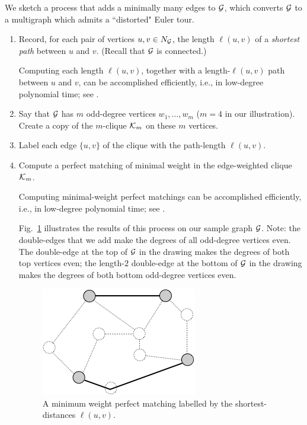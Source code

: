 We sketch a process that adds a minimally many edges to $\mbox{$\cal G$}$, which converts $\mbox{$\cal G$}$ to a multigraph which admits a ``distorted" Euler tour. 
\begin{enumerate}
\item
Record, for each pair of vertices $u, v \in N_{\mbox{{\scriptsize $\cal G$}}}$, the  length $\ell(u,v)$ of a {\em shortest path} between $u$ and $v$.  (Recall that $\mbox{$\cal G$}$ is connected.)

\smallskip

Computing each length $\ell(u,v)$, together with a length-$\ell(u,v)$ path between $u$ and $v$, can be accomplished efficiently, i.e., in low-degree polynomial time; see \cite{CLRS}.

\item
Say that $\mbox{$\cal G$}$ has $m$ odd-degree vertices $w_1, \ldots, w_m$ ($m=4$ in our illustration).  Create a copy of the $m$-clique $\mbox{$\cal K$}_m$ on these $m$ vertices.

\item
Label each edge $\{u,v\}$ of the clique with the path-length $\ell(u,v)$.

\item
Compute a perfect matching of minimal weight in the edge-weighted clique $\mbox{$\cal K$}_m$.

\smallskip

Computing minimal-weight perfect matchings can be accomplished efficiently, i.e., in low-degree polynomial time; see \cite{CLRS}.

\smallskip

Fig.~\ref{fig:Eulerianperfectmatching} illustrates the results of this process on our sample graph $\mbox{$\cal G$}$.   Note: the double-edges that we add make the degrees of all odd-degree vertices even.  The double-edge at the top of $\mbox{$\cal G$}$ in the drawing makes the degrees of both top vertices even; the length-$2$ double-edge at the bottom of $\mbox{$\cal G$}$ in the drawing makes the degrees of both bottom odd-degree vertices even.
\begin{figure}[hbt]
\begin{center}
       \includegraphics[scale=0.4]{FiguresGraph/EulerienPerfectMatching}
       \caption{A minimum weight perfect matching labelled by the shortest-distances $\ell(u,v)$.}
              \label{fig:Eulerianperfectmatching}
\end{center}
\end{figure}


\end{enumerate}
